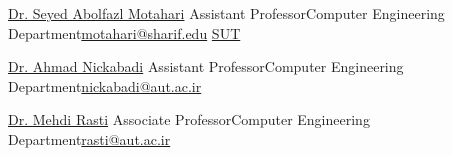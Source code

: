 
\newcommand{\refskip}{\enskip\cdotp\enskip}
\newcommand{\cesuffix}{{\refskip}Computer Engineering Department}

\begin{cvhonors}

  \cvref
    {\href{https://scholar.google.com/citations?user=rJ-biB0AAAAJ&hl=en}{Dr. Seyed Abolfazl Motahari}} %
    {Assistant Professor\cesuffix\refskip\href{mailto:motahari@sharif.edu}{motahari@sharif.edu}} %
    {\href{https://www.sharif.edu}{SUT}} %

  \cvref
    {\href{https://scholar.google.com/citations?user=pSMNSZwAAAAJ&hl=en}{Dr. Ahmad Nickabadi}} %
    {Assistant Professor\cesuffix\refskip\href{mailto:nickabadi@aut.ac.ir}{nickabadi@aut.ac.ir}} %
    {} %

  \cvref
    {\href{https://scholar.google.com/citations?user=zb8pjMYAAAAJ&hl=en}{Dr. Mehdi Rasti}} %
    {Associate Professor\cesuffix\refskip\href{mailto:rasti@aut.ac.ir}{rasti@aut.ac.ir}} %
    {} %





\end{cvhonors}
